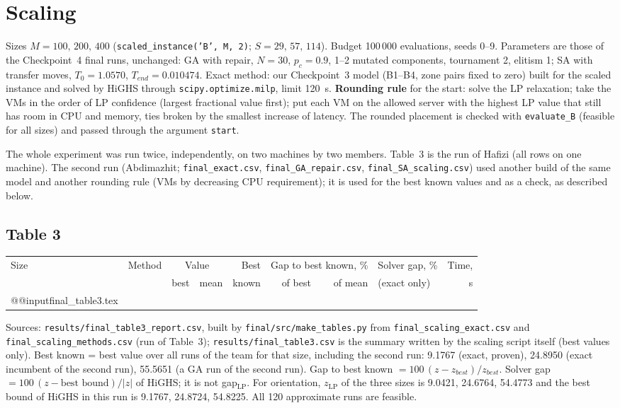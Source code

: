 \documentclass[11pt,a4paper]{article}
\newcommand{\zLP}{z_{\mathrm{LP}}}
\begin{document}
\section{Scaling}

Sizes $M=100,\,200,\,400$ (\texttt{scaled\_instance('B', M, 2)}; $S=29,\,57,\,114$). Budget 100\,000 evaluations, seeds 0--9. Parameters are those of the Checkpoint~4 final runs, unchanged: GA with repair, $N=30$, $p_c=0.9$, 1--2 mutated components, tournament 2, elitism 1; SA with transfer moves, $T_0=1.0570$, $T_{end}=0.010474$. Exact method: our Checkpoint~3 model (B1--B4, zone pairs fixed to zero) built for the scaled instance and solved by HiGHS through \texttt{scipy.optimize.milp}, limit 120~s. \textbf{Rounding rule} for the start: solve the LP relaxation; take the VMs in the order of LP confidence (largest fractional value first); put each VM on the allowed server with the highest LP value that still has room in CPU and memory, ties broken by the smallest increase of latency. The rounded placement is checked with \texttt{evaluate\_B} (feasible for all sizes) and passed through the argument \texttt{start}.

The whole experiment was run twice, independently, on two machines by two members. Table~3 is the run of Hafizi (all rows on one machine). The second run (Abdimazhit; \texttt{final\_exact.csv}, \texttt{final\_GA\_repair.csv}, \texttt{final\_SA\_scaling.csv}) used another build of the same model and another rounding rule (VMs by decreasing CPU requirement); it is used for the best known values and as a check, as described below.

\subsection*{Table 3}
{\footnotesize\setlength{\tabcolsep}{4pt}
\begin{tabular}{@{}llrrrrrlr@{}}
\toprule
Size & Method & \multicolumn{2}{c}{Value} & Best & \multicolumn{2}{c}{Gap to best known, \%} & Solver gap, \% & Time,\\
 & & best & mean & known & of best & of mean & (exact only) & s\\
\midrule
\csname @@input\endcsname final_table3.tex
\bottomrule
\end{tabular}}

{\small\raggedright Sources: \texttt{results/final\_table3\_report.csv}, built by \texttt{final/src/make\_tables.py} from \texttt{final\_scaling\_exact.csv} and \texttt{final\_scaling\_methods.csv} (run of Table~3); \texttt{results/final\_table3.csv} is the summary written by the scaling script itself (best values only). Best known = best value over all runs of the team for that size, including the second run: 9.1767 (exact, proven), 24.8950 (exact incumbent of the second run), 55.5651 (a GA run of the second run). Gap to best known $=100\,(z-z_{best})/z_{best}$. Solver gap $=100\,(z-\text{best bound})/|z|$ of HiGHS; it is not gap$_{\mathrm{LP}}$. For orientation, $\zLP$ of the three sizes is 9.0421, 24.6764, 54.4773 and the best bound of HiGHS in this run is 9.1767, 24.8724, 54.8225. All 120 approximate runs are feasible.\par}
\end{document}
